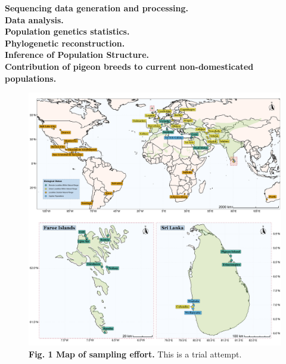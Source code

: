 \documentclass[twoside, british, a4paper]{article}
\begin{document}
\begin{multicols}{2}
\noindent \textbf{Sequencing data generation and processing.}\\
\noindent \textbf{Data analysis.}\\
\noindent \textbf{Population genetics statistics.}\\
\noindent \textbf{Phylogenetic reconstruction.}\\
\noindent \textbf{Inference of Population Structure.}\\
\noindent \textbf{Contribution of pigeon breeds to current non-domesticated populations.}\\
\end{multicols}

\begin{figure}[!ht]
\centering
\includegraphics[scale=0.4]{../FPG--Plots/FPG--Map/FPG--Map.pdf}
\caption*{ \scriptsize \textbf{Fig. 1 Map of sampling effort.} This is a trial attempt.}
\label{MainText:FPGP--Map}
\end{figure}
\end{document}
